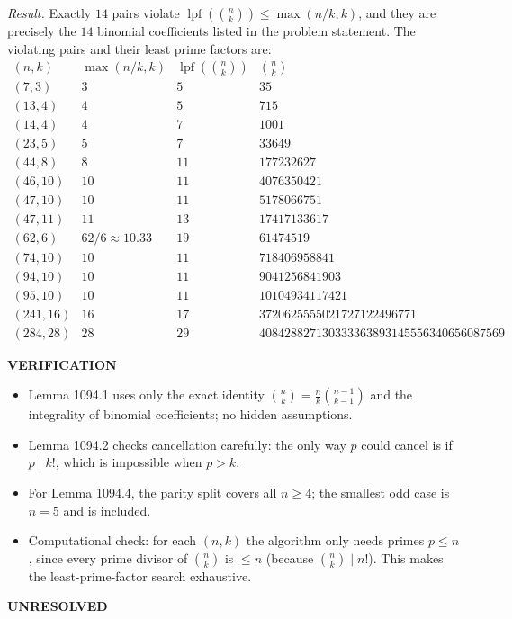 \smallskip
\noindent
\emph{Result.} Exactly $14$ pairs violate
$\operatorname{lpf}(\binom{n}{k})\le\max(n/k,k)$, and they are precisely the $14$ binomial coefficients listed in the problem statement. The violating pairs and their least prime factors are:
\[
\begin{array}{r|r|r|r}
(n,k) & \max(n/k,k) & \operatorname{lpf}(\binom{n}{k}) & \binom{n}{k} \\\hline
(7,3) & 3 & 5 & 35\\
(13,4) & 4 & 5 & 715\\
(14,4) & 4 & 7 & 1001\\
(23,5) & 5 & 7 & 33649\\
(44,8) & 8 & 11 & 177232627\\
(46,10) & 10 & 11 & 4076350421\\
(47,10) & 10 & 11 & 5178066751\\
(47,11) & 11 & 13 & 17417133617\\
(62,6) & 62/6\approx 10.33 & 19 & 61474519\\
(74,10) & 10 & 11 & 718406958841\\
(94,10) & 10 & 11 & 9041256841903\\
(95,10) & 10 & 11 & 10104934117421\\
(241,16) & 16 & 17 & 3720625555021727122496771\\
(284,28) & 28 & 29 & 408428827130333363893145556340656087569
\end{array}
\]

\medskip
\noindent\textbf{VERIFICATION}

\smallskip
\noindent
\begin{itemize}
\item Lemma 1094.1 uses only the exact identity $\binom{n}{k}=\frac{n}{k}\binom{n-1}{k-1}$ and the integrality of binomial coefficients; no hidden assumptions.
\item Lemma 1094.2 checks cancellation carefully: the only way $p$ could cancel is if $p\mid k!$, which is impossible when $p>k$.
\item For Lemma 1094.4, the parity split covers all $n\ge 4$; the smallest odd case is $n=5$ and is included.
\item Computational check: for each $(n,k)$ the algorithm only needs primes $p\le n$, since every prime divisor of $\binom{n}{k}$ is $\le n$ (because $\binom{n}{k}\mid n!$). This makes the least-prime-factor search exhaustive.
\end{itemize}

\medskip
\noindent\textbf{UNRESOLVED}

